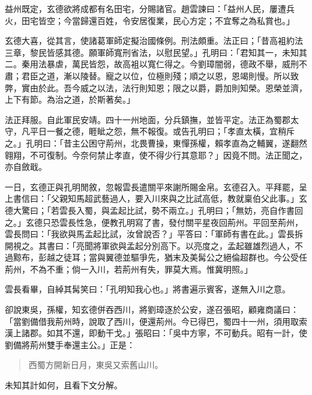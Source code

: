益州既定，玄德欲將成都有名田宅，分賜諸官。趙雲諫曰：「益州人民，屢遭兵火，田宅皆空；今當歸還百姓，令安居復業，民心方定；不宜奪之為私賞也。」

玄德大喜，從其言，使諸葛軍師定擬治國條例。刑法頗重。法正曰；「昔高袓約法三章，黎民皆感其德。願軍師寬刑省法，以慰民望。」孔明曰：「君知其一，未知其二。秦用法暴虐，萬民皆怨，故高袓以寬仁得之。今劉璋闇弱，德政不舉，威刑不肅；君臣之道，漸以陵替。寵之以位，位極則殘；順之以恩，恩竭則慢。所以致弊，實由於此。吾今威之以法，法行則知恩；限之以爵，爵加則知榮。恩榮並濟，上下有節。為治之道，於斯著矣。」

法正拜服。自此軍民安靖。四十一州地面，分兵鎮撫，並皆平定。法正為蜀郡太守，凡平日一餐之德，睚眦之怨，無不報復。或告孔明曰；「孝直太橫，宜稍斥之。」孔明曰：「昔主公困守荊州，北畏曹操，東憚孫權，賴孝直為之輔翼，遂翻然翱翔，不可復制。今奈何禁止孝直，使不得少行其意耶？」因竟不問。法正聞之，亦自斂戢。

一日，玄德正與孔明閒敘，忽報雲長遣關平來謝所賜金帛。玄德召入。平拜罷，呈上書信曰：「父親知馬超武藝過人，要入川來與之比試高低，教就稟伯父此事。」玄德大驚曰；「若雲長入蜀，與孟起比試，勢不兩立。」孔明曰；「無妨，亮自作書回之。」玄德只恐雲長性急，便教孔明寫了書，發付關平星夜回荊州。平回至荊州，雲長問曰：「我欲與馬孟起比試，汝曾說否？」平答曰：「軍師有書在此。」雲長拆開視之。其書曰：「亮聞將軍欲與孟起分別高下。以亮度之，孟起雖雄烈過人，不過黥布，彭越之徒耳；當與翼德並驅爭先，猶末及美髯公之絕倫超群也。今公受任荊州，不為不重；倘一入川，若荊州有失，罪莫大焉。惟冀明照。」

雲長看畢，自綽其髯笑曰：「孔明知我心也。」將書遍示賓客，遂無入川之意。

卻說東吳，孫權，知玄德併吞西川，將劉璋逐於公安，遂召張昭，顧雍商議曰：「當劉備借我荊州時，說取了西川，便還荊州。今已得巴，蜀四十一州，須用取索漢上諸郡。如其不還，即動干戈。」張昭曰：「吳中方寧，不可動兵。昭有一計，使劉備將荊州雙手奉還主公。」正是：

\begin{quote}
西蜀方開新日月，東吳又索舊山川。
\end{quote}

未知其計如何，且看下文分解。
